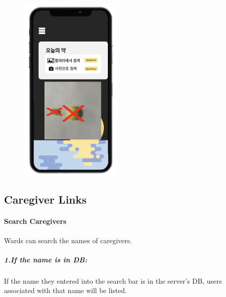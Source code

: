 \documentclass[conference]{IEEEtran}
\begin{document}
\begin{figure}[h!]
\centering
\includegraphics[width=5cm]{final_image_folder/today_result_photo.png}
\caption{}
\label{fig:map}
\end{figure}

\subsection{Caregiver Links}

\paragraph{Search Caregivers}
Wards can search the names of caregivers.\\

\subparagraph{1.If the name is in DB: }
If the name they entered into the search bar is in the server's DB, users associated with that name will be listed.\\
\end{document}
